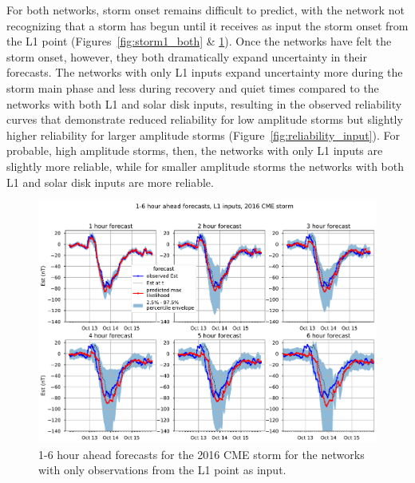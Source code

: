 \documentclass{agujournal2018}
\begin{document}
For both networks, storm onset remains difficult to predict, with the network not recognizing that a storm has begun until it receives as input the storm onset from the L1 point (Figures~\ref{fig:storm1_both} \& \ref{fig:storm1_l1}). Once the networks have felt the storm onset, however, they both dramatically expand uncertainty in their forecasts. The networks with only L1 inputs expand uncertainty more during the storm main phase and less during recovery and quiet times compared to the networks with both L1 and solar disk inputs, resulting in the observed reliability curves that demonstrate reduced reliability for low amplitude storms but slightly higher reliability for larger amplitude storms (Figure~\ref{fig:reliability_input}). For probable, high amplitude storms, then, the networks with only L1 inputs are slightly more reliable, while for smaller amplitude storms the networks with both L1 and solar disk inputs are more reliable.

\begin{figure}[htbp]
   \centering
   \includegraphics[width=1\textwidth]{figures/supplement/est_forecast_1-6_hour_L1_storm1.pdf}
   \caption{1-6 hour ahead forecasts for the 2016 CME storm for the networks with only observations from the L1 point as input.}
   \label{fig:storm1_l1}
\end{figure}
\end{document}
